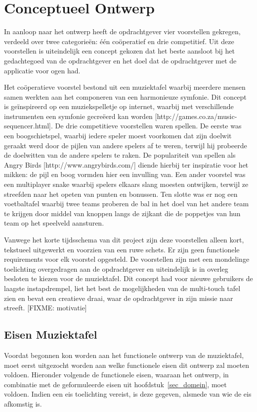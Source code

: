 \documentclass{acm}
\begin{document}
\section{Conceptueel Ontwerp}
\label{sec_concept}
In aanloop naar het ontwerp heeft de opdrachtgever vier voorstellen gekregen, verdeeld over twee categorie\"en: \'e\'en co\"operatief en drie competitief. Uit deze voorstellen is uiteindelijk een concept gekozen dat het beste aansloot bij het gedachtegoed van de opdrachtgever en het doel dat de opdrachtgever met de applicatie voor ogen had.

Het co\"operatieve voorstel bestond uit een muziektafel waarbij meerdere mensen samen werkten aan het componeren van een harmonieuze symfonie. Dit concept is geïnspireerd op een muziekspelletje op internet, waarbij met verschillende instrumenten een symfonie gecreëerd kan worden [http://games.co.za/music-sequencer.html]. De drie competitieve voorstellen waren spellen. De eerste was een boogschietspel, waarbij iedere speler moest voorkomen dat zijn doelwit geraakt werd door de pijlen van andere spelers af te weren, terwijl hij probeerde de doelwitten van de andere spelers te raken. De populariteit van spellen als Angry Birds [http://www.angrybirds.com/] diende hierbij ter inspiratie voor het mikken: de pijl en boog vormden hier een invulling van. Een ander voorstel was een multiplayer snake waarbij spelers elkaars slang moesten ontwijken, terwijl ze streefden naar het opeten van punten en bonussen. Ten slotte was er nog een voetbaltafel waarbij twee teams proberen de bal in het doel van het andere team te krijgen door middel van knoppen langs de zijkant die de poppetjes van hun team op het speelveld aansturen.

Vanwege het korte tijdsschema van dit project zijn deze voorstellen alleen kort, tekstueel uitgewerkt en voorzien van een ruwe schets. Er zijn geen functionele requirements voor elk voorstel opgesteld. De voorstellen zijn met een mondelinge toelichting overgedragen aan de opdrachtgever en uiteindelijk is in overleg besloten te kiezen voor de muziektafel. Dit concept had voor nieuwe gebruikers de laagste instapdrempel, liet het best de mogelijkheden van de multi-touch tafel zien en bevat een creatieve draai, waar de opdrachtgever in zijn missie naar streeft. [FIXME: motivatie]

\subsection{Eisen Muziektafel}
Voordat begonnen kon worden aan het functionele ontwerp van de muziektafel, moet eerst uitgezocht worden aan welke functionele eisen dit ontwerp zal moeten voldoen. Hieronder volgende de functionele eisen, waaraan het ontwerp, in combinatie met de geformuleerde eisen uit hoofdstuk~\ref{sec_domein}, moet voldoen. Indien een eis toelichting vereist, is deze gegeven, alsmede van wie de eis afkomstig is.
\end{document}

